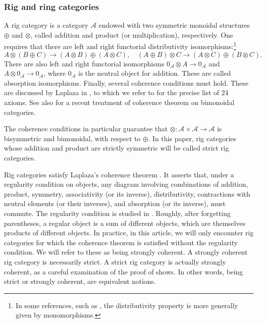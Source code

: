 \documentclass[JEP,XML,SOM,Unicode,published]{cedram}
\theoremstyle{plain}
\theoremstyle{definition}
\newcommand{\Acal}{\mathcal A}
\begin{document}
\subsubsection{Rig and ring categories}\label{subsubsec:rig-and-ring-categories}

A rig category is a category $\Acal$ endowed with two symmetric monoidal structures $\oplus$ and $\otimes$, called addition and product (or multiplication), respectively. One requires that there are left and right functorial distributivity isomorphisms:\footnote{In some references, such as \cite{Laplaza}, the distributivity property is more generally given by monomorphisms.}\vspace*{-3pt}\enlargethispage{\baselineskip}
\begin{displaymath}
A\otimes (B\oplus C)\to (A\otimes B)\oplus (A\otimes C),\quad (A\oplus B)\otimes C\to (A\otimes C)\oplus (B\otimes C).
\end{displaymath}
There are also left and right functorial isomorphisms $ 0_{\Acal}\otimes A\to 0_{\Acal}$ and $A\otimes 0_{\Acal}\to 0_{\Acal}$, where $0_{\Acal}$ is the neutral object for addition. These are called absorption isomorphisms. Finally, several coherence conditions must hold. These are discussed by Laplaza in \cite[]{Laplaza}, to which we refer to for the precise list of 24 axioms. See also \cite[Vol.\,I]{Johnson-Yau} for a recent treatment of coherence theorem on bimonoidal categories.

The coherence conditions in particular guarantee that $\otimes\colon\Acal\times\Acal\to\Acal$ is bisymmetric and bimonoidal, with respect to $\oplus$. In this paper, rig categories whose addition and product are strictly symmetric will be called strict rig categories.

Rig categories satisfy Laplaza's coherence theorem \cite[]{Laplaza}. It asserts that, under a regularity condition on objects, any diagram involving combinations of addition, product, symmetry, associativity (or its inverse), distributivity, contractions with neutral elements (or their inverses), and absorption (or its inverse), must commute. The regularity condition is studied in \cite[]{Laplaza}. Roughly, after forgetting parentheses, a regular object is a sum of different objects, which are themselves products of different objects. In practice, in this article, we will only encounter rig categories for which the coherence theorem is satisfied without the regularity condition. We will refer to these as being strongly coherent. A strongly coherent rig category is necessarily strict. A strict rig category is actually strongly coherent, as a careful examination of the proof of \cite[Prop.\,10]{Laplaza} shows. In other words, being strict or strongly coherent, are equivalent notions.
\end{document}
